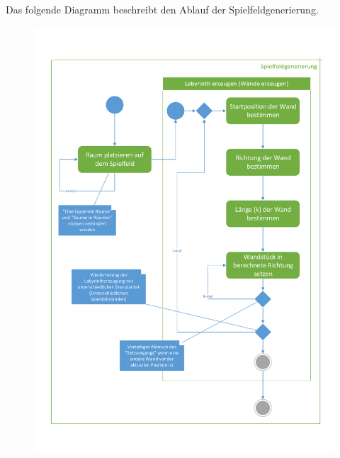 Das folgende Diagramm beschreibt den Ablauf der Spielfeldgenerierung.

\begin{figure}[H]
\centering
\includegraphics[scale=0.65]{images/spielfeldgenerierung.pdf}

\end{figure}

